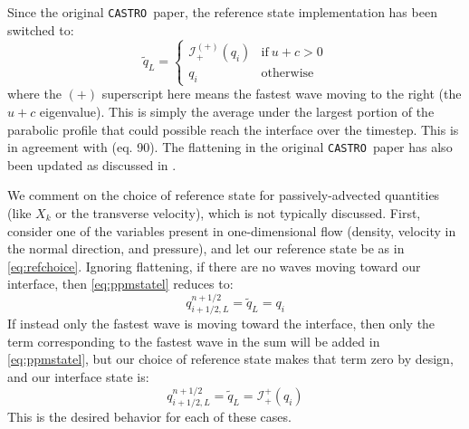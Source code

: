 \documentclass[iop,numberedappendix]{../emulateapj}
\newcommand{\castro}{\texttt{CASTRO}}
\begin{document}
Since the original \castro\ paper, the reference state implementation
has been switched to:
\begin{equation}
\label{eq:refchoice}
\tilde{q}_L = \left \{ \begin{array}{cc}
       \mathcal{I}_+^{(+)}(q_i) & \mathrm{if~} u + c > 0 \\
       q_i                    & \mathrm{otherwise}
\end{array}
\right .
\end{equation}
where the $(+)$ superscript here means the fastest wave moving to the right
(the $u+c$ eigenvalue).   This is simply the average under the largest
portion of the parabolic profile that could possible reach the interface 
over the timestep.  This is
in agreement with \citet{ppmunsplit} (eq. 90).  The flattening
in the original \castro\ paper has also been updated as discussed
in \citet{zingalekatz:2015}.

We comment on the choice of reference state for passively-advected
quantities (like $X_k$ or the transverse velocity), which is not typically 
discussed. First, consider one of the variables present in one-dimensional flow
(density, velocity in the normal direction, and pressure), and let our 
reference state be as in \autoref{eq:refchoice}.
Ignoring flattening, if there are no waves moving toward our
interface, then \autoref{eq:ppmstatel} reduces to:
\begin{equation}
q_{i+1/2,L}^{n+1/2} = \tilde{q}_L = q_i
\end{equation}
If instead only the fastest wave is moving toward the interface, then
only the term corresponding to the fastest wave in the sum will be
added in \autoref{eq:ppmstatel}, but our choice of reference state makes
that term zero by design, and our interface state is:
\begin{equation}
q_{i+1/2,L}^{n+1/2} = \tilde{q}_L = \mathcal{I}_+^{+}(q_i)
\end{equation}
This is the desired behavior for each of these cases. 
\end{document}
